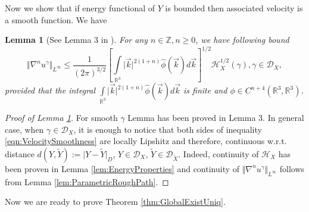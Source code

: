 \documentclass[11pt,a4paper,leqno]{amsart}%
\theoremstyle{plain}
\theoremstyle{remark}
\theoremstyle{plain}
\newtheorem{lemma}[theorem]{Lemma}
\numberwithin{equation}{section}
\def\Rnu{{\mathbb R}}
\def\intl{\int\limits}
\begin{document}
Now we show that if energy functional of $Y$ is bounded then
associated velocity is a smooth function. We have
\begin{lemma}[See Lemma $3$ in \cite{[Bers+Gub_2007]}]\label{lem:VelocitySmoothness}
For any $n\in \mathbb{Z},n\geq 0$, we have following bound
\begin{equation}
\Vert \nabla^n u^{\gamma}\Vert_{L^{\infty}}\leq
\frac{1}{(2\pi)^{3/2}}\left[\intl_{\Rnu^3}\vert \vec{k}\vert^{2(1+n)}\hat{\phi}(\vec{k})d\vec{k}\right]^{1/2}\mathcal{H}_X^{1/2}(\gamma),
\gamma\in\mathcal{D}_X,\label{eqn:VelocitySmoothness}
\end{equation}
provided that the integral
$\intl_{\Rnu^3}\vert \vec{k}\vert^{2(1+n)}\hat{\phi}(\vec{k})d\vec{k}$ is
finite and $\phi\in C^{n+4}(\Rnu^3,\Rnu^3)$.
\end{lemma}
\begin{proof}[Proof of Lemma \ref{lem:VelocitySmoothness}]
For smooth $\gamma$ Lemma has been proved in
\cite{[Bers+Gub_2007]} Lemma $3$. In general case, when
$\gamma\in\mathcal{D}_X$, it is enough to notice that both sides
of inequality \eqref{eqn:VelocitySmoothness} are locally Lipshitz
and therefore, continuous w.r.t. distance
$d(Y,\tilde{Y}):=\vert Y-\tilde{Y}\vert_D$, $Y\in\mathcal{D}_X$,
$\tilde{Y}\in\mathcal{D}_{\tilde{X}}$. Indeed, continuity of
$\mathcal{H}_X$ has been proven in Lemma
\ref{lem:EnergyProperties} and continuity of $\Vert \nabla^n
u^{\gamma}\Vert_{L^{\infty}}$ follows from Lemma
\ref{lem:ParametricRoughPath}.
\end{proof}
Now we are ready to prove Theorem \ref{thm:GlobalExistUniq}.
\end{document}
